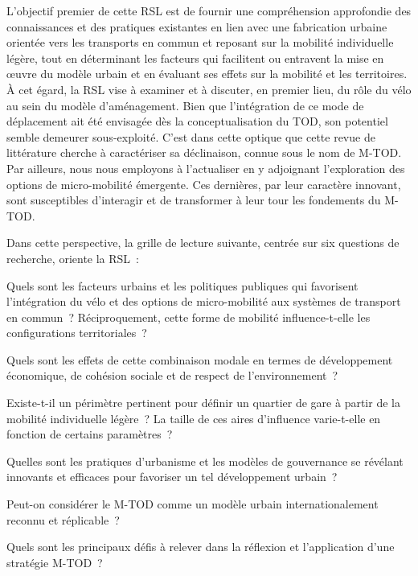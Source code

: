 \begin{refsegment}
L'objectif premier de cette \acrshort{RSL} est de fournir une compréhension approfondie des connaissances et des pratiques existantes en lien avec une fabrication urbaine orientée vers les transports en commun et reposant sur la mobilité individuelle légère, tout en déterminant les facteurs qui facilitent ou entravent la mise en œuvre du modèle urbain et en évaluant ses effets sur la mobilité et les territoires. À cet égard, la \acrshort{RSL} vise à examiner et à discuter, en premier lieu, du rôle du vélo au sein du modèle d'aménagement. Bien que l'intégration de ce mode de déplacement ait été envisagée dès la conceptualisation du \acrshort{TOD}, son potentiel semble demeurer sous-exploité. C'est dans cette optique que cette revue de littérature cherche à caractériser sa déclinaison, connue sous le nom de \acrshort{M-TOD}. Par ailleurs, nous nous employons à l'actualiser en y adjoignant l'exploration des options de \gls{micro-mobilité} émergente. Ces dernières, par leur caractère innovant, sont susceptibles d'interagir et de transformer à leur tour les fondements du \acrshort{M-TOD}.

Dans cette perspective, la grille de lecture suivante, centrée sur six questions de recherche, oriente la \acrshort{RSL}~:
    \begin{customitemize}
        \item Quels sont les facteurs urbains et les politiques publiques qui favorisent l'intégration du vélo et des options de micro-mobilité aux systèmes de transport en commun~? Réciproquement, cette forme de mobilité influence-t-elle les configurations territoriales~?
        \item Quels sont les effets de cette combinaison modale en termes de développement économique, de cohésion sociale et de respect de l'environnement~?
        \item Existe-t-il un périmètre pertinent pour définir un quartier de gare à partir de la mobilité individuelle légère~? La taille de ces aires d'influence varie-t-elle en fonction de certains paramètres~?
        \item Quelles sont les pratiques d'urbanisme et les modèles de gouvernance se révélant innovants et efficaces pour favoriser un tel développement urbain~?
        \item Peut-on considérer le \acrshort{M-TOD} comme un modèle urbain internationalement reconnu et réplicable~?
        \item Quels sont les principaux défis à relever dans la réflexion et l'application d'une stratégie \acrshort{M-TOD}~?
    \end{customitemize}%


\end{refsegment}
